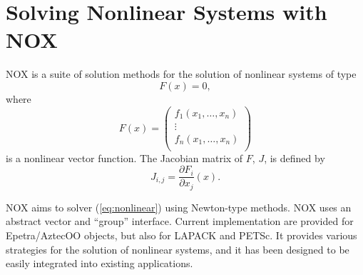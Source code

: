 % 
% 
% 
%  
%  
% 

\section{Solving Nonlinear Systems with NOX}
\label{chap:nox}

NOX is a suite of solution methods for the solution of nonlinear
systems of type
\begin{equation}
\label{eq:nonlinear}
F(x) = 0,
\end{equation}
where
\[
F(x) = 
\begin{pmatrix}
  f_1(x_1, \ldots, x_n) \\
  \vdots \\
  f_n(x_1, \ldots, x_n) \\
\end{pmatrix}
\]
is a nonlinear vector function. The Jacobian matrix of $F$, $J$, is
defined by
\[
J_{i,j} = \frac{ \partial F_i}{\partial x_j} (x).
\]

NOX aims to solver (\ref{eq:nonlinear}) using Newton-type methods. NOX
uses an abstract vector and ``group'' interface. Current implementation
are provided for Epetra/AztecOO objects, but also for LAPACK and PETSc.
It provides various strategies for the solution of nonlinear systems,
and it has been designed to be easily integrated into existing
applications.

